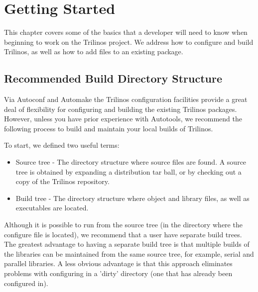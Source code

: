 \documentclass[12pt,strict]{TrilinosDevGuide}
\begin{document}
\section{Getting Started}
\label{Section:GettingStarted}
This chapter covers some of the basics that a developer will need to know when 
beginning to work on the Trilinos project.  We address how to configure and 
build Trilinos, as well as how to add files to an existing package.

\subsection{Recommended Build Directory Structure}

Via Autoconf and Automake the Trilinos configuration facilities
provide a great deal of flexibility for configuring and building the
existing Trilinos packages.  However, unless you have prior experience
with Autotools, we recommend the following process to build and
maintain your local builds of Trilinos.

To start, we defined two useful terms:
\begin{itemize}
\item Source tree - The directory structure where source files are found.  A source 
tree is obtained by expanding a distribution tar ball, or by checking 
out a copy of the Trilinos repository.  
\item Build tree - The directory structure where object and library files, as well 
as executables are located.  
\end{itemize}
 
\begin{minipage}[c]{\textwidth}

\begin{minipage}[l]{.6\textwidth}

Although it is possible to run  from the source tree (in 
the directory where the configure file is located), we recommend that a 
user have separate build trees.  The greatest advantage to having a separate 
build tree is that multiple builds of the libraries can be maintained
from the same source tree, for 
example, serial and parallel libraries.  A less obvious advantage is that 
this approach eliminates problems with configuring in a 'dirty'
directory (one that has 
already been configured in).
\end{minipage}\hfill
{}
\end{minipage}
\end{document}
